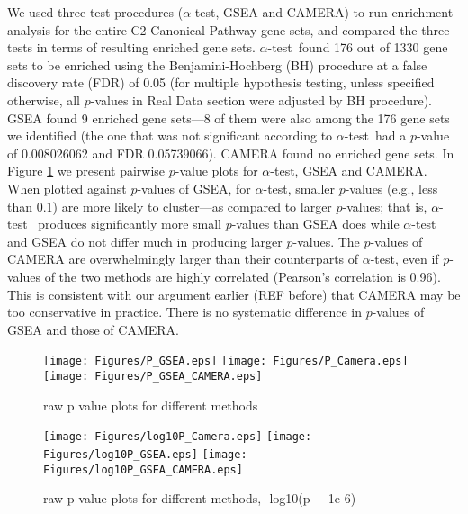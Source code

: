 \documentclass[useAMS,usenatbib, galley]{biom}
\newcommand{\OurMethod}{$\alpha$-test}
\begin{document}
	
	We used three test procedures (\OurMethod, GSEA and CAMERA) to run enrichment analysis for the entire C2 Canonical Pathway gene sets, and compared the three tests in terms of resulting enriched gene sets. \OurMethod~found 176 out of 1330 gene sets to be enriched using the Benjamini-Hochberg (BH) procedure at a false discovery rate (FDR) of 0.05 (for multiple hypothesis testing, unless specified otherwise, all $p$-values in Real Data section were adjusted by BH procedure). GSEA found 9 enriched gene sets---8 of them were also among the 176 gene sets we identified (the one that was not significant according to \OurMethod~had a $p$-value of 0.008026062 and FDR 0.05739066). CAMERA found no enriched gene sets. In Figure \ref{fig:HDdatap} we present pairwise $p$-value plots for \OurMethod, GSEA and CAMERA. When plotted against $p$-values of GSEA, for \OurMethod, smaller $p$-values (e.g., less than 0.1) are more likely to cluster---as compared to larger $p$-values; that is, \OurMethod~ produces significantly more small $p$-values than GSEA does while \OurMethod~ and GSEA do not differ much in producing larger $p$-values.
	The $p$-values of CAMERA are overwhelmingly larger than their counterparts of \OurMethod, even if $p$-values of the two methods are highly correlated (Pearson's correlation is 0.96). This is consistent with our argument earlier (REF before) that CAMERA may be too conservative in practice. There is no systematic difference in $p$-values of GSEA and those of CAMERA. 
	\begin{figure}[H]
		\begin{center}
			\texttt{[image: Figures/P\_GSEA.eps]}
			\texttt{[image: Figures/P\_Camera.eps]}
			\texttt{[image: Figures/P\_GSEA\_CAMERA.eps]}
		\end{center} 
			\caption{raw p value plots for different methods}\label{fig:HDdatap}
	\end{figure} 
	
	\begin{figure}[H]
		\begin{center}
			\texttt{[image: Figures/log10P\_Camera.eps]}
			\texttt{[image: Figures/log10P\_GSEA.eps]}
			\texttt{[image: Figures/log10P\_GSEA\_CAMERA.eps]}
		\end{center} 
				\caption{raw p value plots for different methods, -log10(p  + 1e-6)}\label{fig:HDdatalog10p}
	\end{figure} 
	
\end{document}
